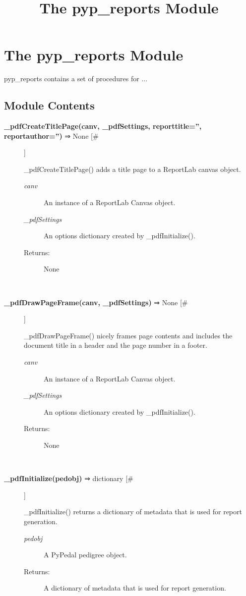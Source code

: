 \documentclass[10pt]{article}
\title{The pyp\_reports Module}
\begin{document}
\section*{The pyp\_reports Module}


 pyp\_reports contains a set of procedures for ...
\subsection*{Module Contents}
\begin{description}
\item[\textbf{\_pdfCreateTitlePage(canv, \_pdfSettings, reporttitle='', reportauthor='')}
 ⇒ None [\#]]

 \_pdfCreateTitlePage() adds a title page to a ReportLab canvas object.
\begin{description}
\item[\emph{canv}
] An instance of a ReportLab Canvas object.
\item[\emph{\_pdfSettings}
] An options dictionary created by \_pdfInitialize().
\item[Returns:] None

\end{description}
\\ 

\item[\textbf{\_pdfDrawPageFrame(canv, \_pdfSettings)}
 ⇒ None [\#]]

 \_pdfDrawPageFrame() nicely frames page contents and includes the document title in a header and the page number in a footer.
\begin{description}
\item[\emph{canv}
] An instance of a ReportLab Canvas object.
\item[\emph{\_pdfSettings}
] An options dictionary created by \_pdfInitialize().
\item[Returns:] None

\end{description}
\\ 

\item[\textbf{\_pdfInitialize(pedobj)}
 ⇒ dictionary [\#]]

 \_pdfInitialize() returns a dictionary of metadata that is used for report generation.
\begin{description}
\item[\emph{pedobj}
] A PyPedal pedigree object.
\item[Returns:] A dictionary of metadata that is used for report generation.


\end{description}
\end{description}
\end{document}
